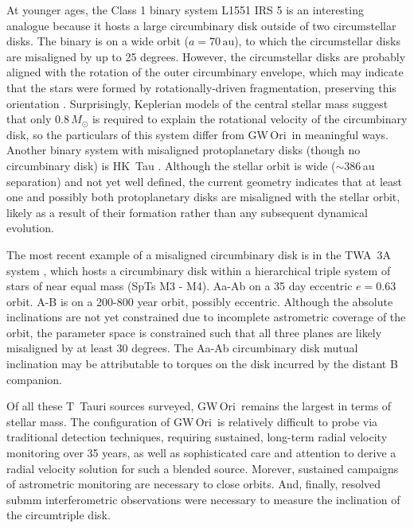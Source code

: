 \documentclass[twocolumn]{aastex61}
\newcommand{\obj}{GW\,Ori}
\begin{document}
At younger ages, the Class 1 binary system L1551 IRS 5 is an interesting analogue because it hosts a large circumbinary disk \citep[$r\sim500$\,au, $M_\mathrm{disk} \approx 0.07 \,M_\odot$;][]{eisner12,takakuwa17} outside of two circumstellar disks. The binary is on a wide orbit ($a = 70\,\mathrm{au}$), to which the circumstellar disks are misaligned by up to 25 degrees. However, the circumstellar disks are probably aligned with the rotation of the outer circumbinary envelope, which may indicate that the stars were formed by rotationally-driven fragmentation, preserving this orientation \citep{lim16}. Surprisingly, Keplerian models of the central stellar mass suggest that only $0.8\,M_\odot$ is required to explain the rotational velocity of the circumbinary disk, so the particulars of this system differ from \obj\ in meaningful ways. Another binary system with misaligned protoplanetary disks (though no circumbinary disk) is HK~Tau \citep{jensen14}. Although the stellar orbit is wide ($\sim$386\,au separation) and not yet well defined, the current geometry indicates that at least one and possibly both protoplanetary disks are misaligned with the stellar orbit, likely as a result of their formation rather than any subsequent dynamical evolution.

The most recent example of a misaligned circumbinary disk is in the TWA~3A system \citep{kellog17}, which hosts a circumbinary disk within a hierarchical triple system of stars of near equal mass (SpTs M3 - M4). Aa-Ab on a 35 day eccentric $e=0.63$ orbit. A-B is on a 200-800 year orbit, possibly eccentric. Although the absolute inclinations are not yet constrained due to incomplete astrometric coverage of the orbit, the parameter space is constrained such that all three planes are likely misaligned by at least 30 degrees. The Aa-Ab circumbinary disk mutual inclination may be attributable to torques on the disk incurred by the distant B companion.

Of all these T~Tauri sources surveyed, \obj\ remains the largest in terms of stellar mass. The configuration of \obj\ is relatively difficult to probe via traditional detection techniques, requiring sustained, long-term radial velocity monitoring over 35 years, as well as sophisticated care and attention to derive a radial velocity solution for such a blended source. Morever, sustained campaigns of astrometric monitoring are necessary to close orbits. And, finally, resolved submm interferometric observations were necessary to measure the inclination of the circumtriple disk.
\end{document}
